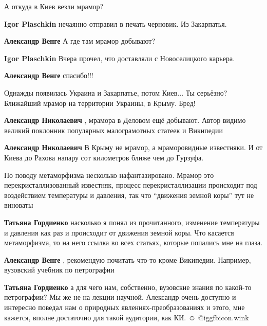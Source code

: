 \begin{itemize}
А откуда в Киев везли мрамор?

\begin{itemize} %
\textbf{Igor Plaschkin} нечаянно отправил в печать черновик. Из Закарпатья.

\textbf{Александр Венге} А где там мрамор добывают?

\textbf{Igor Plaschkin} Вчера прочел, что доставляли с Новоселицкого карьера.

\textbf{Александр Венге} спасибо!!!
\end{itemize} %


Однажды появилась Украина и Закарпатье, потом Киев... Ты серьёзно? Ближайший
мрамор на территории Украины, в Крыму. Бред!

\begin{itemize} %
\textbf{Александр Николаевич} , мрамора в Деловом ещё добывают. Автор видимо великий поклонник популярных малограмотных статеек и Википедии

\textbf{Александр Николаевич} В Крыму не мрамор, а мраморовидные известняки. И от Киева до Рахова напару сот километров ближе чем до Гурзуфа.
\end{itemize} %


По поводу метаморфизма несколько нафантазировано. Мрамор это
перекристаллизованный известняк, процесс перекристаллизации происходит под
воздействием температуры и давления, так что \enquote{движения земной коры} тут не
виноваты

\begin{itemize} %
\textbf{Татьяна Гордиенко} насколько я понял из прочитанного, изменение температуры и давления как раз и происходит от движения земной коры. Что касается метаморфизма, то на него ссылка во всех статьях, которые попались мне на глаза.

\textbf{Александр Венге} , рекомендую почитать что-то кроме Википедии. Например, вузовский учебник по петрографии

\textbf{Татьяна Гордиенко} а для чего нам, собственно, вузовские знания по какой-то петрографии? Мы же не на лекции научной. Александр очень доступно и интересно поведал нам о природных явлениях-преобразованиях и этого, мне кажется, вполне достаточно для такой аудитории, как КИ. ☺ @igg{fbicon.wink} 


\end{itemize}
\end{itemize}
